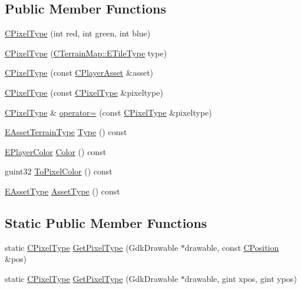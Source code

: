 \subsection*{Public Member Functions}
\begin{DoxyCompactItemize}
\item 
\hyperlink{classCPixelType_a393381dca7114d6279bcee1e5f280e4b}{C\+Pixel\+Type} (int red, int green, int blue)
\item 
\hyperlink{classCPixelType_a8adc1d375b7d644025dcca8ff0849c76}{C\+Pixel\+Type} (\hyperlink{classCTerrainMap_aff2ab991e237269941416dd79d8871d4}{C\+Terrain\+Map\+::\+E\+Tile\+Type} type)
\item 
\hyperlink{classCPixelType_abf05fa378b6e924c40d3616d6c718557}{C\+Pixel\+Type} (const \hyperlink{classCPlayerAsset}{C\+Player\+Asset} \&asset)
\item 
\hyperlink{classCPixelType_a393a54c12c99809690961764f8f002fe}{C\+Pixel\+Type} (const \hyperlink{classCPixelType}{C\+Pixel\+Type} \&pixeltype)
\item 
\hyperlink{classCPixelType}{C\+Pixel\+Type} \& \hyperlink{classCPixelType_a3bcba5fcc9d9cb0a2504f6f3d913c175}{operator=} (const \hyperlink{classCPixelType}{C\+Pixel\+Type} \&pixeltype)
\item 
\hyperlink{classCPixelType_af06457fd1c2ff34c67ce670e633a10b0}{E\+Asset\+Terrain\+Type} \hyperlink{classCPixelType_ac2d23be310266e7679b248435f05f2d3}{Type} () const
\item 
\hyperlink{GameDataTypes_8h_aafb0ca75933357ff28a6d7efbdd7602f}{E\+Player\+Color} \hyperlink{classCPixelType_a54864220447608dfad4cd579a5a4016c}{Color} () const
\item 
guint32 \hyperlink{classCPixelType_abdad3e51c47f410745f7795931798cb3}{To\+Pixel\+Color} () const
\item 
\hyperlink{GameDataTypes_8h_a5600d4fc433b83300308921974477fec}{E\+Asset\+Type} \hyperlink{classCPixelType_addcf6c6d11e8ebafe4455beaa995b675}{Asset\+Type} () const
\end{DoxyCompactItemize}
\subsection*{Static Public Member Functions}
\begin{DoxyCompactItemize}
\item 
static \hyperlink{classCPixelType}{C\+Pixel\+Type} \hyperlink{classCPixelType_af38a22feec4bef33deeb628b0877d464}{Get\+Pixel\+Type} (Gdk\+Drawable $\ast$drawable, const \hyperlink{classCPosition}{C\+Position} \&pos)
\item 
static \hyperlink{classCPixelType}{C\+Pixel\+Type} \hyperlink{classCPixelType_a91ab76ebf6c87934a8738018686746d4}{Get\+Pixel\+Type} (Gdk\+Drawable $\ast$drawable, gint xpos, gint ypos)
\end{DoxyCompactItemize}
